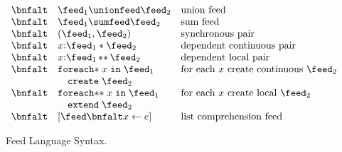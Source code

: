\begin{figure}[t]
\[\begin{array}{lll}
 \bnfalt & \feed_1 \unionfeed \feed_2 & \mbox{union feed} \\
 \bnfalt & \feed_1 \sumfeed \feed_2 & \mbox{sum feed} \\
 \bnfalt & (\feed_1, \feed_2) & \mbox{synchronous pair} \\
 \bnfalt & x{:}\feed_1 * \feed_2 & \mbox{dependent continuous pair} \\
 \bnfalt & x{:}\feed_1\, {*}{*} \, \feed_2 & \mbox{dependent local pair} \\
 \bnfalt &     \mathtt{foreach{*}}\; x \; 
    \mathtt{in}\; \feed_1 & \mbox{for each $x$ create continuous $\feed_2$} \\
 &   \quad \mathtt{create}\; \feed_2 \\
 \bnfalt &     \mathtt{foreach{*}{*}}\; x \; 
    \mathtt{in}\; \feed_1 & \mbox{for each $x$ create local $\feed_2$}\\
 &   \quad \mathtt{extend}\; \feed_2 \\
 \bnfalt & [\feed \bnfalt x \leftarrow e ] & \mbox{list comprehension feed} \\
\end{array}
\]
\caption{Feed Language Syntax.}
\label{fig:syntax}
\end{figure}


